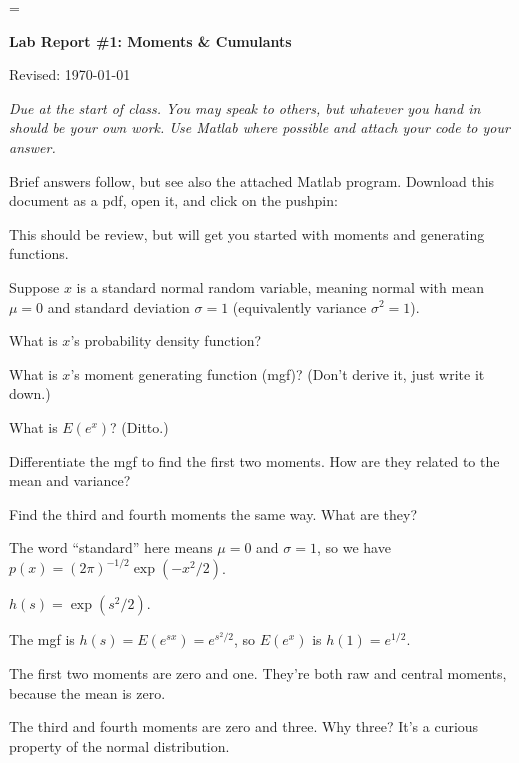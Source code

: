 \documentclass[11pt]{exam}
\begin{document}
\parskip=\bigskipamount
\parindent=0.0in
\thispagestyle{empty}


\bigskip\bigskip
\centerline{\Large \bf Lab Report \#1: Moments \& Cumulants}
\centerline{Revised: \today}

\bigskip
{\it Due at the start of class.
You may speak to others, but whatever you hand in should be your own work.
Use Matlab where possible and attach your code to your answer.}

\begin{questions}

\begin{solution}
Brief answers follow,
but see also the attached Matlab program.
Download this document as a pdf, open it, and click on the pushpin:
\end{solution}

This should be review, but will get you started with
moments and generating functions.

Suppose $x$ is a standard normal random variable,
meaning normal with mean $\mu = 0$ and standard deviation $\sigma = 1$
(equivalently variance $\sigma^2 = 1$).
%
\begin{parts}
\item What is $x$'s probability density function?
\item What is $x$'s moment generating function (mgf)?
(Don't derive it, just write it down.)
\item What is $E (e^x)$?  (Ditto.)
\item Differentiate the mgf to find the first two moments.
How are they related to the mean and variance?
\item Find the third and fourth moments the same way.
What are they?
\end{parts}

\begin{solution}
\begin{parts}
\item The word ``standard'' here means $\mu = 0$ and $\sigma = 1$, so we have
$p(x) = (2\pi)^{-1/2} \exp(-x^2/2) $.
\item $ h(s) = \exp( s^2/2) $.
\item The mgf is $h(s) = E(e^{sx}) = e^{s^2/2}$,
so $E(e^x)$ is $ h(1) = e^{1/2} $.
\item The first two moments are zero and one.
They're both raw and central moments, because the mean is zero.
\item The third and fourth moments are zero and three.
Why three?  It's a curious property of the normal distribution.
\end{parts}
\end{solution}


\end{questions}
\end{document}
